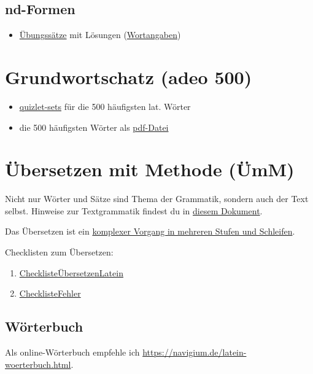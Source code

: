 \documentclass{scrartcl}
\begin{document}
\subsection{nd-Formen}
\label{sec:org11d67ed}

\begin{itemize}
\item \href{https://www.dropbox.com/s/ykmw8sncd4x5gly/nd-Formen\_Rep.pdf?dl=0}{Übungssätze} mit Lösungen (\href{https://www.dropbox.com/s/psg50w3n8azfi13/Wortangaben\_nd-Formen.pdf?dl=0}{Wortangaben})
\end{itemize}

\section{Grundwortschatz (adeo 500)}
\label{sec:org40c2000}
\begin{itemize}
\item \href{https://quizlet.com/class/1319955/}{quizlet-sets} für die 500 häufigsten lat. Wörter
\item die 500 häufigsten Wörter als \href{https://www.dropbox.com/s/v7m335rmadbrobt/500vocabula.pdf?dl=0}{pdf-Datei}
\end{itemize}

\section{Übersetzen mit Methode (ÜmM)}
\label{sec:org6ac178b}
Nicht nur Wörter und Sätze sind Thema der Grammatik, sondern auch der Text selbst. Hinweise zur Textgrammatik findest du in \href{https://www.dropbox.com/s/fbswvhejksw6kl6/pronomina.pdf?dl=0}{diesem Dokument}.

Das Übersetzen ist ein \href{https://www.dropbox.com/s/sj3ao2p098tt7ie/\%C3\%9Cbersetzen.pdf?dl=0}{komplexer Vorgang in mehreren Stufen und Schleifen}.

Checklisten zum Übersetzen:
\begin{enumerate}
\item \href{https://www.dropbox.com/s/r5je01sv9uulkzz/Checkliste\%C3\%9CbersetzenLatein.pdf?dl=0}{ChecklisteÜbersetzenLatein}
\item \href{https://www.dropbox.com/s/3g9uftxb833bqau/ChecklisteFehler.pdf?dl=0}{ChecklisteFehler}
\end{enumerate}

\subsection{Wörterbuch}
\label{sec:org6253f65}
Als online-Wörterbuch empfehle ich \url{https://navigium.de/latein-woerterbuch.html}.
\end{document}

